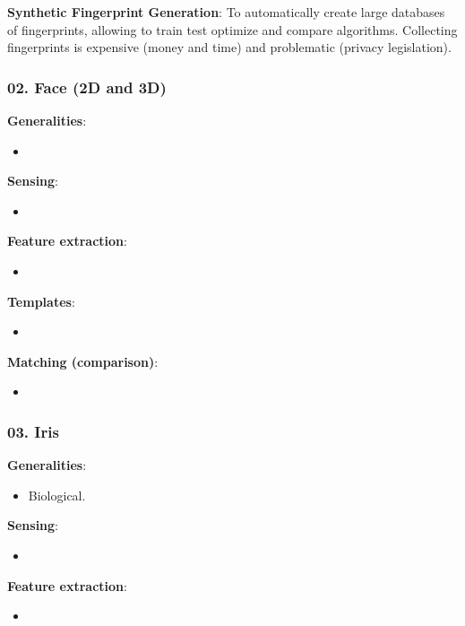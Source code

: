 \documentclass[a4paper]{article}
\begin{document}
      \textbf{Synthetic Fingerprint Generation}: To automatically create large databases of fingerprints, allowing to train test optimize and compare algorithms. Collecting fingerprints is expensive (money and time) and problematic (privacy legislation).
    \subsubsection*{02. Face (2D and 3D)}
      \textbf{Generalities}:
      \begin{itemize}
        \item 
      \end{itemize}

      \textbf{Sensing}:
      \begin{itemize}
        \item 
      \end{itemize}

      \textbf{Feature extraction}:
      \begin{itemize}
        \item 
      \end{itemize}

      \textbf{Templates}:
      \begin{itemize}
        \item 
      \end{itemize}

      \textbf{Matching (comparison)}:
      \begin{itemize}
        \item 
      \end{itemize}
    \subsubsection*{03. Iris}
      \textbf{Generalities}:
      \begin{itemize}
        \item Biological.
      \end{itemize}

      \textbf{Sensing}:
      \begin{itemize}
        \item 
      \end{itemize}

      \textbf{Feature extraction}:
      \begin{itemize}
        \item 
      \end{itemize}
\end{document}
